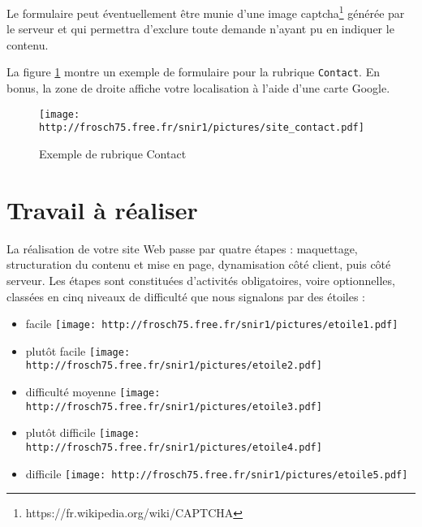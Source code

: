 \documentclass[a4paper,12pt]{article}
\newcommand\Code[1]{\textcolor{couleur_code}{\texttt{#1}}}
\begin{document}
Le formulaire peut éventuellement être munie d'une image 
captcha\footnote{https://fr.wikipedia.org/wiki/CAPTCHA} générée par le serveur
et qui permettra d'exclure toute demande n'ayant pu en indiquer le contenu. 

La figure \ref{fig:mep8} montre un exemple de formulaire pour la rubrique 
\Code{Contact}. En bonus, la zone de droite affiche votre localisation à l'aide 
d'une carte Google.

\begin{figure}[htbp]
  \begin{center}
    \texttt{[image: http://frosch75.free.fr/snir1/pictures/site\_contact.pdf]} 
    \caption{Exemple de rubrique \og{}Contact\fg{}}
    \label{fig:mep8} 
  \end{center}
\end{figure}

\section{Travail à réaliser}\label{sec:travail}
La réalisation de votre site Web passe par quatre étapes : maquettage, 
structuration du contenu et mise en page, dynamisation côté client, puis
côté serveur. Les étapes sont constituées d'activités obligatoires, voire
optionnelles, classées en cinq niveaux de difficulté que nous signalons par 
des étoiles : 
\vspace{3pt}
\begin{itemize}
   \item facile \texttt{[image: http://frosch75.free.fr/snir1/pictures/etoile1.pdf]}
   \item plutôt facile \texttt{[image: http://frosch75.free.fr/snir1/pictures/etoile2.pdf]}
   \item difficulté moyenne \texttt{[image: http://frosch75.free.fr/snir1/pictures/etoile3.pdf]}
   \item plutôt difficile \texttt{[image: http://frosch75.free.fr/snir1/pictures/etoile4.pdf]}
   \item difficile \texttt{[image: http://frosch75.free.fr/snir1/pictures/etoile5.pdf]}
\end{itemize}
\vspace{3pt}
\end{document}
